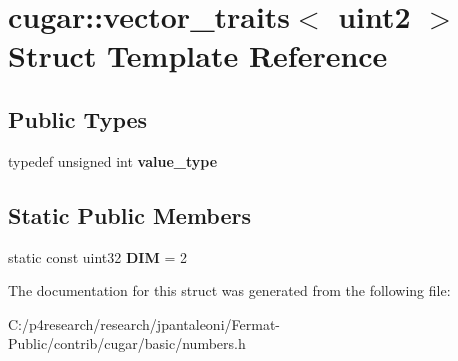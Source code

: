 \hypertarget{structcugar_1_1vector__traits_3_01uint2_01_4}{}\section{cugar\+:\+:vector\+\_\+traits$<$ uint2 $>$ Struct Template Reference}
\label{structcugar_1_1vector__traits_3_01uint2_01_4}
\subsection*{Public Types}
\begin{DoxyCompactItemize}
\item 
\mbox{\label{structcugar_1_1vector__traits_3_01uint2_01_4_a0f0543b3114bb816a77fa72846d387cc}} 
typedef unsigned int {\bfseries value\+\_\+type}
\end{DoxyCompactItemize}
\subsection*{Static Public Members}
\begin{DoxyCompactItemize}
\item 
\mbox{\label{structcugar_1_1vector__traits_3_01uint2_01_4_a9616a394dc5085427d5bc3ed5de1cac2}} 
static const uint32 {\bfseries D\+IM} = 2
\end{DoxyCompactItemize}


The documentation for this struct was generated from the following file\+:\begin{DoxyCompactItemize}
\item 
C\+:/p4research/research/jpantaleoni/\+Fermat-\/\+Public/contrib/cugar/basic/numbers.\+h\end{DoxyCompactItemize}
